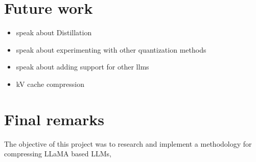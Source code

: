 \section{Future work}
\begin{itemize}
    \item speak about Distillation
    \item speak about experimenting with other quantization methods
    \item speak about adding support for other llms
    \item kV cache compression
\end{itemize}
\section{Final remarks} \label{future_work}
The objective of this project was to research and implement a methodology for compressing LLaMA based LLMs, 